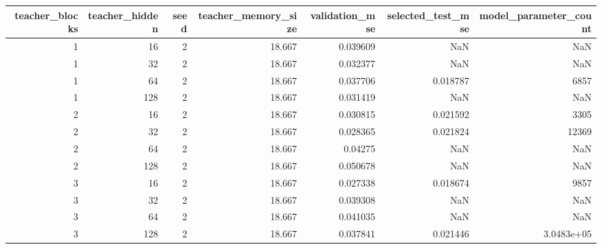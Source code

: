 \begin{tabular}{rrrrrrr}
\toprule
teacher\_blocks & teacher\_hidden & seed & teacher\_memory\_size & validation\_mse & selected\_test\_mse & model\_parameter\_count \\
\midrule
1 & 16 & 2 & 18.667 & 0.039609 & NaN & NaN \\
1 & 32 & 2 & 18.667 & 0.032377 & NaN & NaN \\
1 & 64 & 2 & 18.667 & 0.037706 & 0.018787 & 6857 \\
1 & 128 & 2 & 18.667 & 0.031419 & NaN & NaN \\
2 & 16 & 2 & 18.667 & 0.030815 & 0.021592 & 3305 \\
2 & 32 & 2 & 18.667 & 0.028365 & 0.021824 & 12369 \\
2 & 64 & 2 & 18.667 & 0.04275 & NaN & NaN \\
2 & 128 & 2 & 18.667 & 0.050678 & NaN & NaN \\
3 & 16 & 2 & 18.667 & 0.027338 & 0.018674 & 9857 \\
3 & 32 & 2 & 18.667 & 0.039308 & NaN & NaN \\
3 & 64 & 2 & 18.667 & 0.041035 & NaN & NaN \\
3 & 128 & 2 & 18.667 & 0.037841 & 0.021446 & 3.0483e+05 \\
\bottomrule
\end{tabular}
